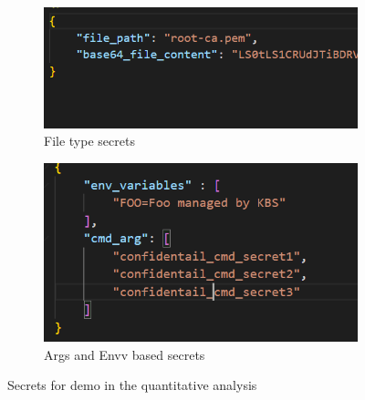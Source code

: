 \begin{figure}[!htb] 
    \begin{subfigure}[b]{0.45\linewidth}
      \centering
      \includegraphics[width=0.9\linewidth]{images/file_secrets.PNG} 
      \caption{File type secrets} 
      \label{fig:file_secrets} 
      \vspace{4ex}
    \end{subfigure}%
    \begin{subfigure}[b]{0.45\linewidth}
      \centering
      \includegraphics[width=0.9\linewidth]{images/cmd_env_secrets.png} 
      \caption{Args and Envv based secrets} 
      \label{fig:cmd_env_secrets} 
      \vspace{4ex}
    \end{subfigure} 
    \caption{Secrets for demo in the quantitative analysis}
    \label{fig5} 
\end{figure}


